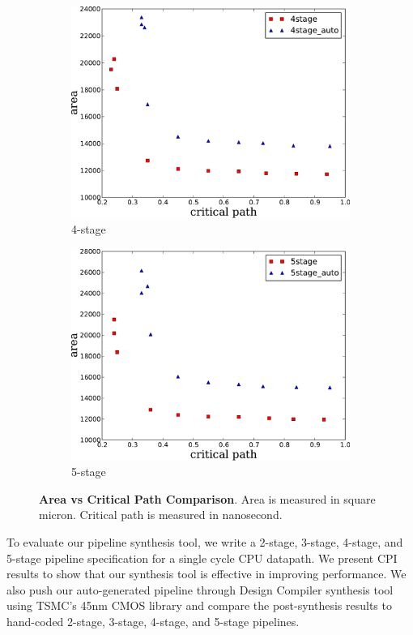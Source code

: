 \begin{figure}[htb]
\begin{subfigure}[t]{0.47\textwidth}
  \label{fig:3stage}
  \vspace{20pt}
  \end{subfigure}
  \hfill
  \begin{subfigure}[t]{0.47\textwidth}
  \centering
  \includegraphics[width=\textwidth]{figures/4stage.pdf}
  \caption{4-stage}
  \label{fig:4stage}
  \end{subfigure}
  \hfill
  \begin{subfigure}[t]{0.47\textwidth}
  \centering
  \includegraphics[width=\textwidth]{figures/5stage.pdf}
  \caption{5-stage}
  \label{fig:5stage}
  \end{subfigure}
\caption{{\bf Area vs Critical Path Comparison}. Area is measured in
  square micron. Critical path is measured in nanosecond.}
\label{fig:area-time}
\end{figure}
To evaluate our pipeline synthesis tool, we write a 2-stage, 3-stage,
4-stage, and 5-stage pipeline specification for a single cycle CPU
datapath. We present CPI results to show that our synthesis tool is
effective in improving performance. We also push our auto-generated
pipeline through Design Compiler synthesis tool using TSMC's 45nm CMOS
library and compare the post-synthesis results to hand-coded 2-stage,
3-stage, 4-stage, and 5-stage pipelines.
